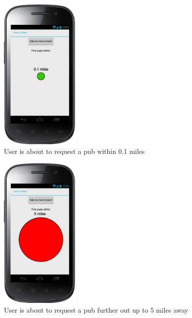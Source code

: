 \documentclass{article}
\begin{document}
\begin{figure}[p]
  \centering
  \includegraphics[height=3in]{../design/main_phone_near.png}
  \caption{User is about to request a pub within 0.1 miles}
\end{figure}
\begin{figure}[p]
  \centering
  \includegraphics[height=3in]{../design/main_phone.png}
  \caption{User is about to request a pub further out up to 5 miles away}
\end{figure}
\end{document}
